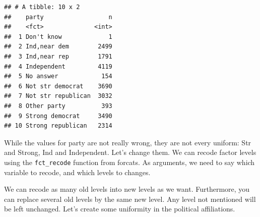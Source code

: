 \documentclass[]{tufte-book}
\newenvironment{Shaded}{}{}
\newcommand{\KeywordTok}[1]{\textcolor[rgb]{0.00,0.44,0.13}{\textbf{#1}}}
\newcommand{\StringTok}[1]{\textcolor[rgb]{0.25,0.44,0.63}{#1}}
\newcommand{\OperatorTok}[1]{\textcolor[rgb]{0.40,0.40,0.40}{#1}}
\newcommand{\ErrorTok}[1]{\textcolor[rgb]{1.00,0.00,0.00}{\textbf{#1}}}
\newcommand{\NormalTok}[1]{#1}
\begin{document}
\begin{Shaded}
\end{Shaded}

\begin{verbatim}
## # A tibble: 10 x 2
##    party                  n
##    <fct>              <int>
##  1 Don't know             1
##  2 Ind,near dem        2499
##  3 Ind,near rep        1791
##  4 Independent         4119
##  5 No answer            154
##  6 Not str democrat    3690
##  7 Not str republican  3032
##  8 Other party          393
##  9 Strong democrat     3490
## 10 Strong republican   2314
\end{verbatim}

While the values for party are not really wrong, they are not every
uniform: Str and Strong, Ind and Independent. Let's change them. We can
recode factor levels using the \texttt{fct\_recode} function from
forcats. As arguments, we need to say which variable to recode, and
which levels to changes.

\begin{Shaded}
\end{Shaded}

We can recode as many old levels into new levels as we want.
Furthermore, you can replace several old levels by the same new level.
Any level not mentioned will be left unchanged. Let's create some
uniformity in the political affiliations.
\end{document}

